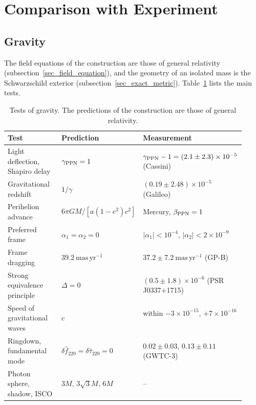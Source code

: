 \documentclass{iopjournal}
\begin{document}
\section{Comparison with Experiment}\label{sec_gamma_coscaling}

\subsection{Gravity}

The field equations of the construction are those of general relativity (subsection~\ref{sec_field_equation}), and the geometry of an isolated mass is the Schwarzschild exterior (subsection~\ref{sec_exact_metric}). Table~\ref{table_coexp} lists the main tests.

\begin{table}[h]
\caption{Tests of gravity. The predictions of the construction are those of general relativity.}
\label{table_coexp}
\begin{tabular}{@{}p{0.36\linewidth}p{0.22\linewidth}p{0.34\linewidth}@{}}
\toprule
Test & Prediction & Measurement\\
\midrule
Light deflection, Shapiro delay & $\gamma_{\rm PPN}=1$ & $\gamma_{\rm PPN}-1=(2.1\pm2.3)\times10^{-5}$ (Cassini)~\cite{Bertotti2003}\\
Gravitational redshift & $1/\gamma$ & $(0.19\pm2.48)\times10^{-5}$ (Galileo)~\cite{Delva2018}\\
Perihelion advance & $6\pi GM/[a(1-e^2)c^2]$ & Mercury, $\beta_{\rm PPN}=1$~\cite{Will2014}\\
Preferred frame & $\alpha_1=\alpha_2=0$ & $|\alpha_1|<10^{-4}$, $|\alpha_2|<2\times10^{-9}$~\cite{Will2014}\\
Frame dragging & $39.2~\mathrm{mas\,yr^{-1}}$ & $37.2\pm7.2~\mathrm{mas\,yr^{-1}}$ (GP-B)~\cite{Everitt2011GPB}\\
Strong equivalence principle & $\Delta=0$ & $(0.5\pm1.8)\times10^{-6}$ (PSR J0337+1715)~\cite{Voisin2020}\\
Speed of gravitational waves & $c$ & within $-3\times10^{-15}$, $+7\times10^{-16}$~\cite{GW170817GRB}\\
Ringdown, fundamental mode & $\delta\hat f_{220}=\delta\hat\tau_{220}=0$ & $0.02\pm0.03$, $0.13\pm0.11$ (GWTC-3)~\cite{LVK2025TGRGWTC3}\\
Photon sphere, shadow, ISCO & $3M$, $3\sqrt3M$, $6M$ & --\\
\bottomrule
\end{tabular}
\end{table}
\end{document}

